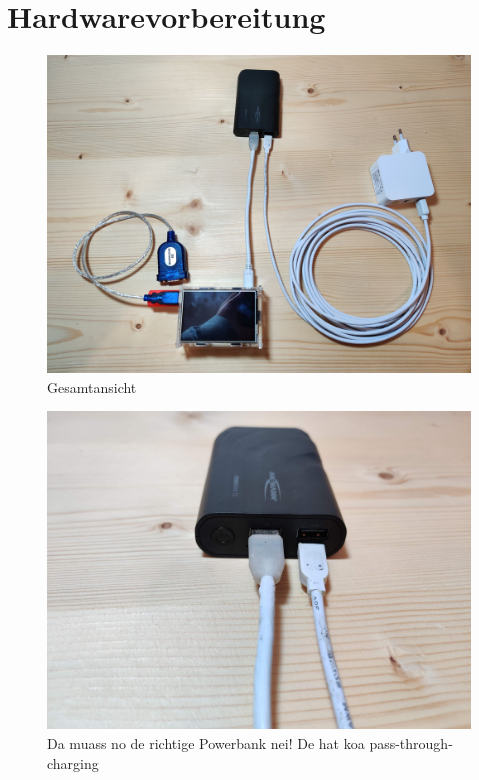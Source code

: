 \documentclass{article}
\begin{document}
\section{Hardwarevorbereitung}
\begin{figure}[h]
\caption{Gesamtansicht}
  \centering
    \includegraphics[height=0.5\textheight]{hardware1.jpg}
\end{figure}
\begin{figure}
  \caption{Da muass no de richtige Powerbank nei! De hat koa pass-through-charging}
  \centering
    \includegraphics[width=1\textwidth]{hardware2.jpg}
\end{figure}
\end{document}
